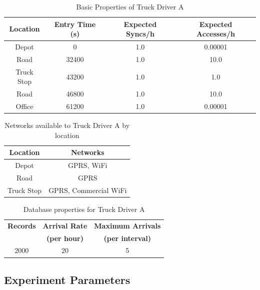 \begin{table}[htdp]
\begin{center}
\begin{tabular}{|c|c|c|c|}
\hline
\textbf{Location} & \textbf{Entry Time (s)} & \textbf{Expected Syncs/h} & \textbf{Expected Accesses/h} \\
\hline
Depot & 0 & 1.0 & 0.00001 \\
\hline
Road & 32400 & 1.0 & 10.0 \\
\hline
Truck Stop & 43200 & 1.0 & 1.0 \\
\hline
Road & 46800 & 1.0 & 10.0 \\
\hline
Office & 61200 & 1.0 & 0.00001 \\
\hline
\end{tabular}
\end{center}
\caption{Basic Properties of Truck Driver A}
\label{trucker_a_properties}
\end{table}

\begin{table}[htdp]
\begin{center}
\begin{tabular}{|c|c|}
\hline
\textbf{Location} & \textbf{Networks} \\
\hline
Depot & GPRS, WiFi \\
\hline
Road & GPRS \\
\hline
Truck Stop & GPRS, Commercial WiFi \\
\hline
\end{tabular}
\end{center}
\caption{Networks available to Truck Driver A by location}
\label{trucker_a_networks}
\end{table}

\begin{table}[htdp]
\begin{center}
\begin{tabular}{|c|c|c|}
\hline
\textbf{Records} &\textbf{Arrival Rate} &\textbf{Maximum Arrivals} \\
 &\textbf{(per hour)} &\textbf{(per interval)} \\
\hline
2000 & 20 & 5 \\
\hline
\end{tabular}
\end{center}
\caption{Database properties for Truck Driver A}
\label{trucker_a_database}
\end{table}

\subsection{Experiment Parameters}

